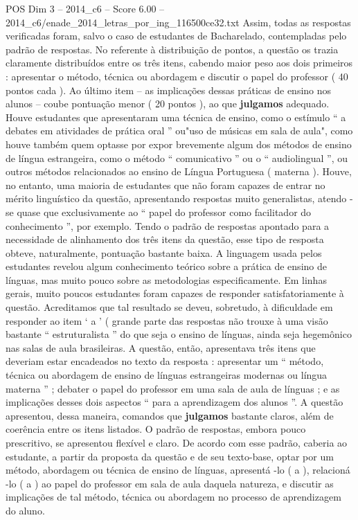 \begin{textsample}{POS Dim 3 – 2014\_c6 – Score 6.00 – 2014\_c6/enade\_2014\_letras\_por\_ing\_116500ce32.txt}
Assim, todas as respostas verificadas foram, salvo o caso de estudantes de Bacharelado, contempladas pelo padrão de respostas.
No referente à distribuição de pontos, a questão os trazia claramente distribuídos entre os três itens, cabendo maior peso aos dois primeiros : apresentar o método, técnica ou abordagem e discutir o papel do professor ( 40 pontos cada ).
Ao último item – as implicações dessas práticas de ensino nos alunos – coube pontuação menor ( 20 pontos ), ao que \textbf{julgamos} adequado.
Houve estudantes que apresentaram uma técnica de ensino, como o estímulo “ a debates em atividades de prática oral ” ou"uso de músicas em sala de aula", como houve também quem optasse por expor brevemente algum dos métodos de ensino de língua estrangeira, como o método “ comunicativo ” ou o “ audiolingual ”, ou outros métodos relacionados ao ensino de Língua Portuguesa ( materna ).
Houve, no entanto, uma maioria de estudantes que não foram capazes de entrar no mérito linguístico da questão, apresentando respostas muito generalistas, atendo -se quase que exclusivamente ao “ papel do professor como facilitador do conhecimento ”, por exemplo.
Tendo o padrão de respostas apontado para a necessidade de alinhamento dos três itens da questão, esse tipo de resposta obteve, naturalmente, pontuação bastante baixa.
A linguagem usada pelos estudantes revelou algum conhecimento teórico sobre a prática de ensino de línguas, mas muito pouco sobre as metodologias especificamente.
Em linhas gerais, muito poucos estudantes foram capazes de responder satisfatoriamente à questão.
Acreditamos que tal resultado se deveu, sobretudo, à dificuldade em responder ao item ‘ a ’ ( grande parte das respostas não trouxe à uma visão bastante “ estruturalista ” do que seja o ensino de línguas, ainda seja hegemônico nas salas de aula brasileiras.
A questão, então, apresentava três itens que deveriam estar encadeados no texto da resposta : apresentar um “ método, técnica ou abordagem de ensino de línguas estrangeiras modernas ou língua materna ” ; debater o papel do professor em uma sala de aula de línguas ; e as implicações desses dois aspectos “ para a aprendizagem dos alunos ”.
A questão apresentou, dessa maneira, comandos que \textbf{julgamos} bastante claros, além de coerência entre os itens listados.
O padrão de respostas, embora pouco prescritivo, se apresentou flexível e claro.
De acordo com esse padrão, caberia ao estudante, a partir da proposta da questão e de seu texto-base, optar por um método, abordagem ou técnica de ensino de línguas, apresentá -lo ( a ), relacioná -lo ( a ) ao papel do professor em sala de aula daquela natureza, e discutir as implicações de tal método, técnica ou abordagem no processo de aprendizagem do aluno.

\end{textsample}
